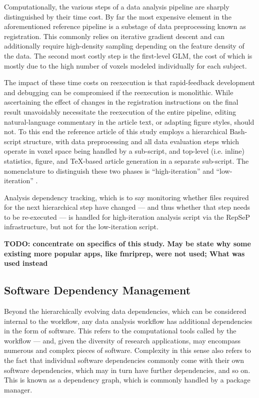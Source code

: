 Computationally, the various steps of a data analysis pipeline are sharply distinguished by their time cost.
By far the most expensive element in the aforementioned reference pipeline is a substage of data preprocessing known as registration.
This commonly relies on iterative gradient descent and can additionally require high-density sampling depending on the feature density of the data.
The second most costly step is the first-level GLM, the cost of which is mostly due to the high number of voxels modeled individually for each subject.

The impact of these time costs on reexecution is that rapid-feedback development and debugging can be compromised if the reexecution is monolithic.
While ascertaining the effect of changes in the registration instructions on the final result unavoidably necessitate the reexecution of the entire pipeline, editing natural-language commentary in the article text, or adapting figure styles, should not.
To this end the reference article of this study employs a hierarchical Bash-script structure, with data preprocessing and all data evaluation steps which operate in voxel space being handled by a sub-script, and top-level (i.e. inline) statistics, figure, and TeX-based article generation in a separate sub-script.
The nomenclature to distinguish these two phases is “high-iteration” and “low-iteration” \supercite{repsep}.

Analysis dependency tracking, which is to say monitoring whether files required for the next hierarchical step have changed — and thus whether that step needs to be re-executed — is handled for high-iteration analysis script via the RepSeP infrastructure, but not for the low-iteration script.

\textbf{TODO: concentrate on specifics of this study.  May be state why some existing more popular apps, like fmriprep, were not used; What was used instead}


\subsection{Software Dependency Management}

Beyond the hierarchically evolving data dependencies, which can be considered internal to the workflow, any data analysis workflow has additional dependencies in the form of software.
This refers to the computational tools called by the workflow — and, given the diversity of research applications, may encompass numerous and complex pieces of software.
Complexity in this sense also refers to the fact that individual software dependencies commonly come with their own software dependencies, which may in turn have further dependencies, and so on.
This is known as a dependency graph, which is commonly handled by a package manager.

